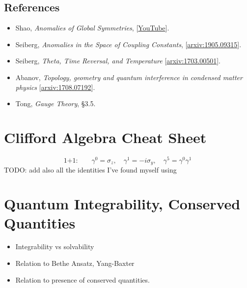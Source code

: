 \documentclass{report}
\begin{document}
\subsection*{References}
\begin{itemize}[nosep]
	\item Shao, \textit{Anomalies of Global Symmetries}, [\href{https://youtu.be/2vTvHYYl1Qk?si=ZWlYzvsV2Sp_n43G}{YouTube}].
	\item Seiberg, \textit{Anomalies in the Space of Coupling 
	Constants}, [\href{https://arxiv.org/abs/1905.09315}{arxiv:1905.09315}].
	\item Seiberg, \textit{Theta, Time Reversal, and Temperature} [\href{https://arxiv.org/abs/1703.00501}{arxiv:1703.00501}].
	\item Abanov, \textit{Topology, geometry and quantum interference in condensed matter physics}
	[\href{https://arxiv.org/abs/1708.07192}{arxiv:1708.07192}].
	\item Tong, \textit{Gauge Theory}, \S 3.5.
\end{itemize}

\section{Clifford Algebra Cheat Sheet}
\begin{equation*}
	\text{1+1:} \qquad \gamma^0 = \sigma_z,\quad 
		\gamma^1 = -i\sigma_y, \quad \gamma^5 = \gamma^0\gamma^1
\end{equation*}
{\color{myred} TODO: add also all the identities I've found myself using}

\section{Quantum Integrability, Conserved Quantities}
\begin{itemize}
	\item Integrability vs solvability
	\item Relation to Bethe Ansatz, Yang-Baxter
	\item Relation to presence of conserved quantities. 
\end{itemize}
\end{document}
